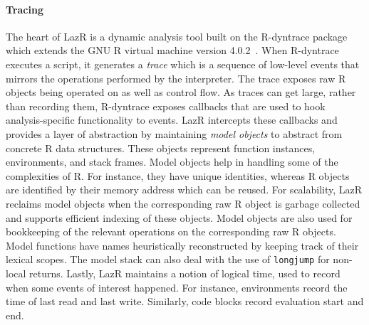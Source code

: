 \documentclass[review,screen,acmsmall]{acmart}
\newcommand{\rdyn}{{\sf R-dyntrace}\xspace}
\renewcommand{\c}[1]{\lstinline |#1|\xspace}
\newcommand{\lazr}{{\sf LazR}\xspace}
\begin{document}
\paragraph{Tracing}
The heart of \lazr is a dynamic analysis tool built on the \rdyn package which
extends the GNU R virtual machine version 4.0.2~\cite{oopsla19b}. When \rdyn
executes a script, it generates a \emph{trace} which is a sequence of low-level
events that mirrors the operations performed by the interpreter. The trace
exposes raw R objects being operated on as well as control flow. As traces can
get large, rather than recording them, \rdyn exposes callbacks that are used to
hook analysis-specific functionality to events. \lazr intercepts these callbacks
and provides a layer of abstraction by maintaining \emph{model objects} to
abstract from concrete R data structures. These objects represent function
instances, environments, and stack frames. Model objects help in handling some
of the complexities of R. For instance, they have unique identities, whereas R
objects are identified by their memory address which can be reused. For
scalability, \lazr reclaims model objects when the corresponding raw R object is
garbage collected and supports efficient indexing of these objects. Model
objects are also used for bookkeeping of the relevant operations on the
corresponding raw R objects. Model functions have names heuristically
reconstructed by keeping track of their lexical scopes. The model stack can also
deal with the use of \c{longjump} for non-local returns. Lastly, \lazr maintains
a notion of logical time, used to record when some events of interest happened.
For instance, environments record the time of last read and last write.
Similarly, code blocks record evaluation start and end.
\end{document}
